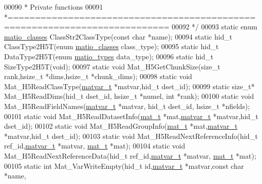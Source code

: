 \begin{DoxyCode}
00090 \textcolor{comment}{ *  Private functions}
00091 \textcolor{comment}{ *===========================================================================}
00092 \textcolor{comment}{ */}
00093 \textcolor{keyword}{static} \textcolor{keyword}{enum} \hyperlink{group___m_a_t_gad4d60ae7b709fc81bfd744fb4c857c40}{matio\_classes} ClassStr2ClassType(\textcolor{keyword}{const} \textcolor{keywordtype}{char} *name);
00094 \textcolor{keyword}{static} hid\_t   ClassType2H5T(\textcolor{keyword}{enum} \hyperlink{group___m_a_t_gad4d60ae7b709fc81bfd744fb4c857c40}{matio\_classes} class\_type);
00095 \textcolor{keyword}{static} hid\_t   DataType2H5T(\textcolor{keyword}{enum} \hyperlink{group___m_a_t_gacf7b3b879282b7ab3a51190e49bf3453}{matio\_types} data\_type);
00096 \textcolor{keyword}{static} hid\_t   SizeType2H5T(\textcolor{keywordtype}{void});
00097 \textcolor{keyword}{static} \textcolor{keywordtype}{void}    Mat\_H5GetChunkSize(\textcolor{keywordtype}{size\_t} rank,hsize\_t *dims,hsize\_t *chunk\_dims);
00098 \textcolor{keyword}{static} \textcolor{keywordtype}{void}    Mat\_H5ReadClassType(\hyperlink{group___m_a_t_structmatvar__t}{matvar\_t} *matvar,hid\_t dset\_id);
00099 \textcolor{keyword}{static} \textcolor{keywordtype}{size\_t}* Mat\_H5ReadDims(hid\_t dset\_id, hsize\_t *numel, \textcolor{keywordtype}{int} *rank);
00100 \textcolor{keyword}{static} \textcolor{keywordtype}{void}    Mat\_H5ReadFieldNames(\hyperlink{group___m_a_t_structmatvar__t}{matvar\_t} *matvar, hid\_t dset\_id, hsize\_t *nfields);
00101 \textcolor{keyword}{static} \textcolor{keywordtype}{void}    Mat\_H5ReadDatasetInfo(\hyperlink{struct__mat__t}{mat\_t} *mat,\hyperlink{group___m_a_t_structmatvar__t}{matvar\_t} *matvar,hid\_t dset\_id);
00102 \textcolor{keyword}{static} \textcolor{keywordtype}{void}    Mat\_H5ReadGroupInfo(\hyperlink{struct__mat__t}{mat\_t} *mat,\hyperlink{group___m_a_t_structmatvar__t}{matvar\_t} *matvar,hid\_t dset\_id);
00103 \textcolor{keyword}{static} \textcolor{keywordtype}{void}    Mat\_H5ReadNextReferenceInfo(hid\_t ref\_id,\hyperlink{group___m_a_t_structmatvar__t}{matvar\_t} *matvar,
      \hyperlink{struct__mat__t}{mat\_t} *mat);
00104 \textcolor{keyword}{static} \textcolor{keywordtype}{void}    Mat\_H5ReadNextReferenceData(hid\_t ref\_id,\hyperlink{group___m_a_t_structmatvar__t}{matvar\_t} *matvar,
      \hyperlink{struct__mat__t}{mat\_t} *mat);
00105 \textcolor{keyword}{static} \textcolor{keywordtype}{int}     Mat\_VarWriteEmpty(hid\_t \textcolor{keywordtype}{id},\hyperlink{group___m_a_t_structmatvar__t}{matvar\_t} *matvar,\textcolor{keyword}{const} \textcolor{keywordtype}{char} *name,

\end{DoxyCode}
